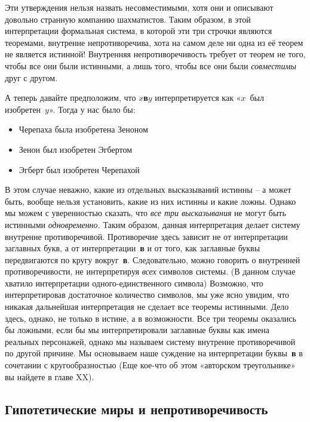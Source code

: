 \documentclass[../main.tex]{subfiles}
\begin{document}
Эти утверждения нельзя назвать несовместимыми, хотя они и описывают довольно странную компанию шахматистов. Таким образом, в этой интерпретации формальная система, в которой эти три строчки являются теоремами, внутренне непротиворечива, хота на самом деле ни одна из её теорем не является истинной! Внутренняя непротиворечивость требует от теорем не того, чтобы все они были истинными, а лишь того, чтобы все они были \emph{совместимы} друг с другом.

А теперь давайте предположим, что \textbf{$x$в$y$} интерпретируется как «$x$~был изобретен~$y$». Тогда у нас было бы:
%
\begin{itemize}[label={}, noitemsep, topsep=6pt]
    \item Черепаха была изобретена Зеноном

    \item Зенон был изобретен Эгбертом

    \item Эгберт был изобретен Черепахой
\end{itemize}

В этом случае неважно, какие из отдельных высказываний истинны \--- а может быть, вообще нельзя установить, какие из них истинны и какие ложны. Однако мы можем с уверенностью сказать, что \emph{все три высказывания} не могут быть истинными \emph{одновременно.} Таким образом, данная интерпретация делает систему внутренне противоречивой. Противоречие здесь зависит не от интерпретации заглавных букв, а от интерпретации~\textbf{в} и от того, как заглавные буквы передвигаются по кругу вокруг~\textbf{в}. Следовательно, можно говорить о внутренней противоречивости, не интерпретируя \emph{всех} символов системы. (В данном случае хватило интерпретации одного-единственного символа) Возможно, что интерпретировав достаточное количество символов, мы уже ясно увидим, что никакая дальнейшая интерпретация не сделает все теоремы истинными. Дело здесь, однако, не только в истине, а в возможности. Все три теоремы оказались бы ложными, если бы мы интерпретировали заглавные буквы как имена реальных персонажей, однако мы называем систему внутренне противоречивой по другой причине. Мы основываем наше суждение на интерпретации буквы~\textbf{в} в сочетании с кругообразностью (Еще кое-что об этом «авторском треугольнике» вы найдете в главе XX).


\subsection{Гипотетические миры и непротиворечивость}
\end{document}
